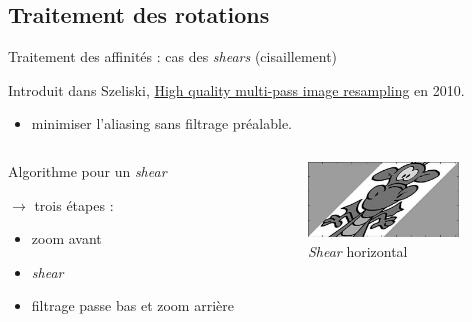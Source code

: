\documentclass[c,12pt]{beamer}
\newcommand{\ra}[0]{\rightarrow}
\begin{document}
\subsection{Traitement des rotations}

\begin{frame}{Traitement des affinités : cas des \emph{shears} (cisaillement)}

Introduit dans Szeliski, \underline{High quality multi-pass image resampling} en 2010. %

\begin{itemize}
\item minimiser l'aliasing sans filtrage préalable.
\end{itemize}

\begin{columns}
\begin{column}{5cm}

\begin{block}{Algorithme pour un \emph{shear}}

$\ra$ trois étapes :

\begin{itemize}
\item zoom avant
\item \emph{shear}
\item filtrage passe bas et zoom arrière
\end{itemize}

\end{block}
  
 \end{column}

\begin{column}{5cm}

\begin{figure}
\centering
\includegraphics[width=4cm]{dragonshear.jpg}
\caption{\emph{Shear} horizontal}
\end{figure}

\end{column}
\end{columns}
\end{frame}
\end{document}
